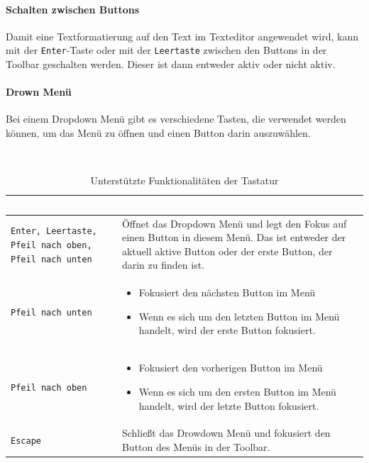\paragraph{Schalten zwischen Buttons}

Damit eine Textformatierung auf den Text im Texteditor angewendet wird, kann mit der \texttt{Enter}-Taste oder mit 
der \texttt{Leertaste} zwischen den Buttons in der Toolbar geschalten werden. Dieser ist dann entweder aktiv oder 
nicht aktiv.

\paragraph{Drown Menü}
 Bei einem Dropdown Menü gibt es verschiedene Tasten, die verwendet werden können, um das Menü zu öffnen und einen Button darin auszuwählen.
 
 ~\begin{table}[H]
	\begin{center}
	\begin{tabular}{| m{4cm} | m{10cm} |}
		\hline
 		\cellcolor{Gray}\textcolor{White}{Taste} & \cellcolor{Gray}\textcolor{White}{Funktionalität}  \\
		\hline
		\texttt{Enter, Leertaste, Pfeil nach oben, Pfeil nach unten} & Öffnet das Dropdown Menü und legt den 
			Fokus auf einen Button in diesem Menü. Das ist entweder der aktuell aktive Button oder der erste 
			Button, der darin zu finden ist. \\
		\hline
		\texttt{Pfeil nach unten} &
		\begin{itemize}
			\item Fokusiert den nächsten Button im Menü
			\item Wenn es sich um den letzten Button im Menü handelt, wird der erste Button fokusiert.
		\end{itemize} \\
		\hline
		\texttt{Pfeil nach oben} &
		\begin{itemize}
			\item Fokusiert den vorherigen Button im Menü
			\item Wenn es sich um den ersten Button im Menü handelt, wird der letzte Button fokusiert.
		\end{itemize} \\
		\hline
		\texttt{Escape} & Schließt das Drowdown Menü und fokusiert den Button des Menüs in der Toolbar. \\
		\hline
	\end{tabular}
	\end{center}
	\caption{Unterstützte Funktionalitäten der Tastatur}
\end{table}

